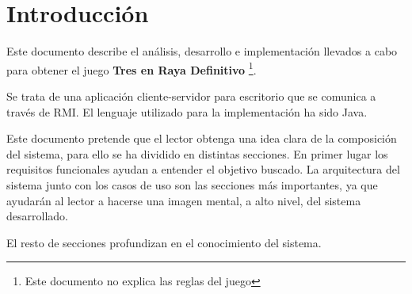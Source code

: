 \documentclass[a4paper,11pt,oneside]{article}
\begin{document}

\setcounter{page}{1}

\tableofcontents
\clearpage

\setcounter{page}{1}

\clearpage
\section{Introducción}

Este documento describe el análisis, desarrollo e implementación llevados a cabo para obtener
el juego \textbf{Tres en Raya Definitivo} \footnote{Este documento no explica las reglas del juego}.

Se trata de una aplicación cliente-servidor para escritorio que se comunica a través de RMI.
El lenguaje utilizado para la implementación ha sido Java.

Este documento pretende que el lector obtenga una idea clara de la composición del sistema, para ello
se ha dividido en distintas secciones. En primer lugar los requisitos funcionales ayudan a entender el objetivo
buscado. La arquitectura del sistema junto con los casos de uso son las secciones más importantes, ya
que ayudarán al lector a hacerse una imagen mental, a alto nivel, del sistema desarrollado.

El resto de secciones profundizan en el conocimiento del sistema.

\clearpage



\clearpage


\clearpage
\end{document}
